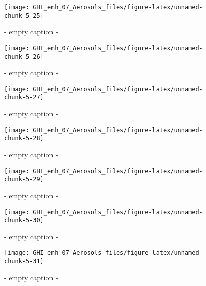 \documentclass[
  10pt,
  a4paper,oneside]{article}
\begin{document}
\begin{figure}[H]

{\centering \texttt{[image: GHI\_enh\_07\_Aerosols\_files/figure-latex/unnamed-chunk-5-25]} 

}

\caption{ - empty caption - }\label{fig:unnamed-chunk-5-25}
\end{figure}
\begin{figure}[H]

{\centering \texttt{[image: GHI\_enh\_07\_Aerosols\_files/figure-latex/unnamed-chunk-5-26]} 

}

\caption{ - empty caption - }\label{fig:unnamed-chunk-5-26}
\end{figure}
\begin{figure}[H]

{\centering \texttt{[image: GHI\_enh\_07\_Aerosols\_files/figure-latex/unnamed-chunk-5-27]} 

}

\caption{ - empty caption - }\label{fig:unnamed-chunk-5-27}
\end{figure}
\begin{figure}[H]

{\centering \texttt{[image: GHI\_enh\_07\_Aerosols\_files/figure-latex/unnamed-chunk-5-28]} 

}

\caption{ - empty caption - }\label{fig:unnamed-chunk-5-28}
\end{figure}
\begin{figure}[H]

{\centering \texttt{[image: GHI\_enh\_07\_Aerosols\_files/figure-latex/unnamed-chunk-5-29]} 

}

\caption{ - empty caption - }\label{fig:unnamed-chunk-5-29}
\end{figure}
\begin{figure}[H]

{\centering \texttt{[image: GHI\_enh\_07\_Aerosols\_files/figure-latex/unnamed-chunk-5-30]} 

}

\caption{ - empty caption - }\label{fig:unnamed-chunk-5-30}
\end{figure}
\begin{figure}[H]

{\centering \texttt{[image: GHI\_enh\_07\_Aerosols\_files/figure-latex/unnamed-chunk-5-31]} 

}

\caption{ - empty caption - }\label{fig:unnamed-chunk-5-31}
\end{figure}
\end{document}
